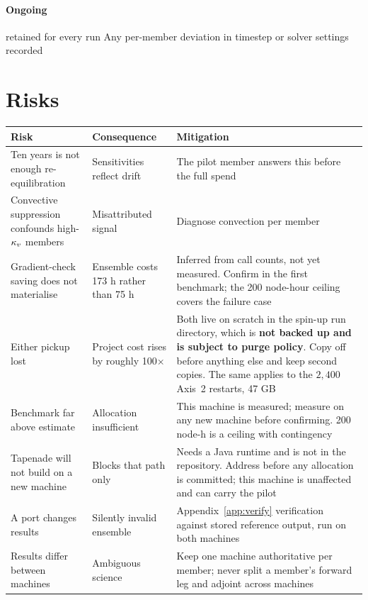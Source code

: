 \paragraph{Ongoing}
\begin{itemize}[leftmargin=2em]
  \ck {} retained for every run
  \ck Any per-member deviation in timestep or solver settings recorded
\end{itemize}

\section{Risks}

\begin{center}
\begin{tabularx}{\textwidth}{@{}Y{0.7}Y{0.7}Y{1.6}@{}}
\toprule
\textbf{Risk} & \textbf{Consequence} & \textbf{Mitigation}\\
\midrule
Ten years is not enough re-equilibration & Sensitivities reflect drift
  & The pilot member answers this before the full spend\\
Convective suppression confounds high-$\kappa_{v}$ members & Misattributed signal
  & Diagnose convection per member\\
Gradient-check saving does not materialise & Ensemble costs 173 h rather than
  75 h & Inferred from call counts, not yet measured. Confirm in the first
  benchmark; the 200 node-hour ceiling covers the failure case\\
Either pickup lost & Project cost rises by roughly 100$\times$
  & Both live on scratch in the spin-up run directory, which is \textbf{not
  backed up and is subject to purge policy}. Copy off before anything else and
  keep second copies. The same applies to the $2{,}400$ Axis~2 restarts, 47 GB\\
Benchmark far above estimate & Allocation insufficient
  & This machine is measured; measure on any new machine before confirming.
  200 node-h is a ceiling with contingency\\
Tapenade will not build on a new machine & Blocks that path only
  & Needs a Java runtime and is not in the repository. Address before any
  allocation is committed; this machine is unaffected and can carry the pilot\\
A port changes results & Silently invalid ensemble
  & Appendix~\ref{app:verify} verification against stored reference output, run
  on both machines\\
Results differ between machines & Ambiguous science
  & Keep one machine authoritative per member; never split a member's forward leg
  and adjoint across machines\\
\bottomrule
\end{tabularx}
\end{center}

